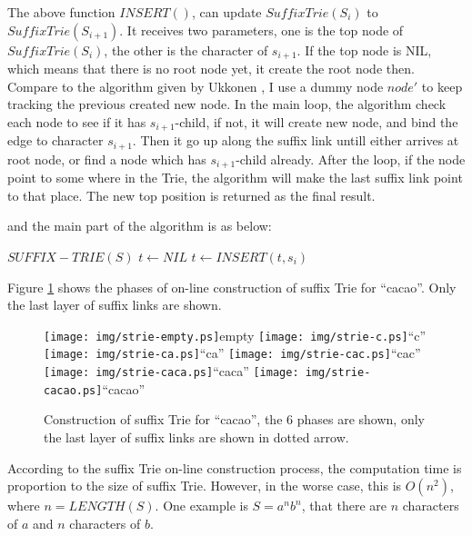 \documentclass{article}
\begin{document}
The above function $INSERT()$, can update $SuffixTrie(S_i)$ to $SuffixTrie(S_{i+1})$.
It receives two parameters, one is the top node of $SuffixTrie(S_i)$, the other
is the character of $s_{i+1}$. If the top node is NIL, which means that there is
no root node yet, it create the root node then. Compare to the algorithm given
by Ukkonen \cite{ukkonen95}, I use a dummy node $node'$ to keep tracking the 
previous created new node. In the main loop, the algorithm check each node
to see if it has $s_{i+1}$-child, if not, it will create new node, and bind the 
edge to character $s_{i+1}$. Then it go up along the suffix link untill either
arrives at root node, or find a node which has $s_{i+1}$-child already. After
the loop, if the node point to some where in the Trie, the algorithm will 
make the last suffix link point to that place. The new top position is returned
as the final result.

and the main part of the algorithm is as below:
\begin{algorithmic}
\STATE $SUFFIX-TRIE(S)$
  \STATE $t \leftarrow NIL$
    \STATE $t \leftarrow INSERT(t, s_i)$
  \ENDFOR
\end{algorithmic}

Figure \ref{fig:cons-strie-cacao} shows the phases of on-line construction
of suffix Trie for ``cacao''. Only the last layer of suffix links are shown.

\begin{figure}[htbp]
   \begin{center}
     \texttt{[image: img/strie-empty.ps]}empty
     \texttt{[image: img/strie-c.ps]}``c''
     \texttt{[image: img/strie-ca.ps]}``ca''
     \texttt{[image: img/strie-cac.ps]}``cac'' \newline
     \texttt{[image: img/strie-caca.ps]}``caca''
     \texttt{[image: img/strie-cacao.ps]}``cacao''
     \caption{Construction of suffix Trie for ``cacao'', the 6 phases are shown, only the last layer of suffix links are shown in dotted arrow.}
     \label{fig:cons-strie-cacao}
   \end{center}
\end{figure}

According to the suffix Trie on-line construction process, the computation time
is proportion to the size of suffix Trie. However, in the worse case, this is 
$O(n^2)$, where $n=LENGTH(S)$. One example is $S=a^nb^n$, that there are $n$ 
characters of $a$ and $n$ characters of $b$.
\end{document}
